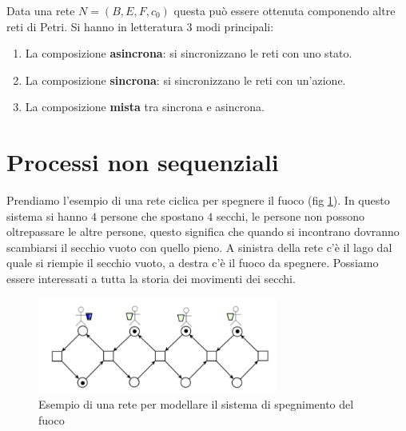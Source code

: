 Data una rete $N = (B,E, F, c_0)$ questa può essere ottenuta componendo altre
reti di Petri. Si hanno in letteratura 3 modi principali:
\begin{enumerate}
    \item La composizione \textbf{asincrona}: si sincronizzano le reti con uno
          stato.
    \item La composizione \textbf{sincrona}: si sincronizzano le reti con
          un'azione.
    \item La composizione \textbf{mista} tra sincrona e asincrona.
\end{enumerate}
\section{Processi non sequenziali}
Prendiamo l'esempio di una rete ciclica per spegnere il fuoco (fig \ref{fig:spegnimento-fuoco}).
In questo sistema si hanno $4$ persone che spostano $4$ secchi, le persone non possono
oltrepassare le altre persone, questo significa che quando si incontrano dovranno
scambiarsi il secchio vuoto con quello pieno. A sinistra della rete c'è il lago
dal quale si riempie il secchio vuoto, a destra c'è il fuoco da spegnere.
Possiamo essere interessati a tutta la storia dei movimenti dei secchi.
\begin{figure}[!ht]
    \centering
    \includegraphics[width=0.7\textwidth]{img/reti/rete_spegnimento_fuoco.png}
    \caption{Esempio di una rete per modellare il sistema di spegnimento del fuoco}
    \label{fig:spegnimento-fuoco}
\end{figure}
